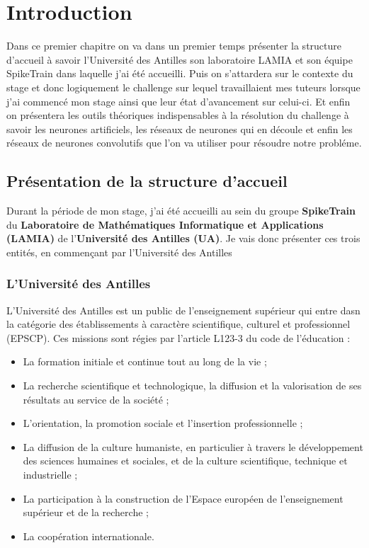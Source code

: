 \hypertarget{Introduction}{%
\chapter{Introduction}\label{Introduction}}

Dans ce premier chapitre on va dans un premier temps présenter la structure d'accueil à savoir l'Université des Antilles son laboratoire LAMIA et son équipe SpikeTrain dans laquelle j'ai été accueilli. Puis on s'attardera sur le contexte du stage et donc logiquement le challenge sur lequel travaillaient mes tuteurs lorsque j'ai commencé mon stage ainsi que leur état d'avancement sur celui-ci. Et enfin on présentera les outils théoriques indispensables à la résolution du challenge à savoir les neurones artificiels, les réseaux de neurones qui en découle et enfin les réseaux de neurones convolutifs que l'on va utiliser pour résoudre notre probléme.
\section{Présentation de la structure
d'accueil}

Durant la période de mon stage, j'ai été accueilli au sein du groupe \textbf{SpikeTrain} du
\textbf{Laboratoire de Mathématiques Informatique et Applications
(LAMIA)} de l'\textbf{Université des Antilles (UA)}.
Je vais donc présenter ces trois entités, en commençant par l'Université des Antilles

\hypertarget{lUniversite-des-antilles}{%
\subsection{L'Université des Antilles}\label{luniversite-des-antilles}}

L'Université des Antilles est un public de l'enseignement supérieur qui entre dasn la catégorie des établissements à  caractère scientifique, culturel et professionnel (EPSCP).
Ces missions sont régies par l'article L123-3 du code de l'éducation :
\begin{itemize}
\item La formation initiale et continue tout au long de la vie ;
\item La recherche scientifique et technologique, la diffusion et la valorisation de ses résultats au service de la société ;
\item L’orientation, la promotion sociale et l’insertion professionnelle ;
\item La diffusion de la culture humaniste, en particulier à travers le développement des sciences humaines et sociales, et de la culture scientifique, technique et industrielle ;
\item La participation à la construction de l’Espace européen de l’enseignement supérieur et de la recherche ;
\item La coopération internationale.
\end{itemize}

